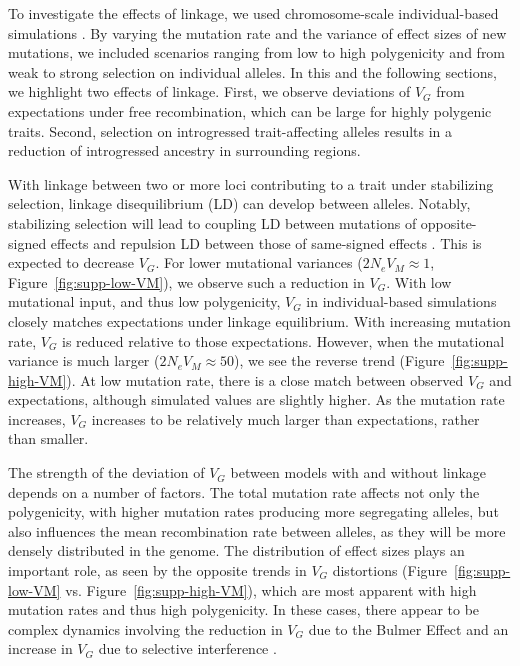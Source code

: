 \documentclass{article}
\begin{document}
To investigate the effects of linkage, we used chromosome-scale
individual-based simulations \citep{thornton2019polygenic}. By varying the
mutation rate and the variance of effect sizes of new mutations, we included
scenarios ranging from low to high polygenicity and from weak to strong
selection on individual alleles. In this and the following sections, we
highlight two effects of linkage. First, we observe deviations of $V_G$ from
expectations under free recombination, which can be large for highly polygenic
traits. Second, selection on introgressed trait-affecting alleles results in a
reduction of introgressed ancestry in surrounding regions.

With linkage between two or more loci contributing to a trait under stabilizing
selection, linkage disequilibrium (LD) can develop between alleles. Notably,
stabilizing selection will lead to coupling LD between mutations of
opposite-signed effects and repulsion LD between those of same-signed effects
\citep{bulmer1971effect}. This is expected to decrease $V_G$. For lower
mutational variances ($2N_e V_M\approx1$, Figure~\ref{fig:supp-low-VM}), we
observe such a reduction in $V_G$. With low mutational input, and thus low
polygenicity, $V_G$ in individual-based simulations closely matches
expectations under linkage equilibrium. With increasing mutation rate, $V_G$ is
reduced relative to those expectations. However, when the mutational variance
is much larger ($2N_eV_M\approx 50$), we see the reverse trend
(Figure~\ref{fig:supp-high-VM}). At low mutation rate, there is a close match
between observed $V_G$ and expectations, although simulated values are slightly
higher. As the mutation rate increases, $V_G$ increases to be relatively much
larger than expectations, rather than smaller.

The strength of the deviation of $V_G$ between models with and without linkage
depends on a number of factors. The total mutation rate affects not only the
polygenicity, with higher mutation rates producing more segregating alleles,
but also influences the mean recombination rate between alleles, as they will
be more densely distributed in the genome. The distribution of effect sizes
plays an important role, as seen by the opposite trends in $V_G$ distortions
(Figure~\ref{fig:supp-low-VM} vs. Figure~\ref{fig:supp-high-VM}), which are
most apparent with high mutation rates and thus high polygenicity. In these
cases, there appear to be complex dynamics involving the reduction in $V_G$ due
to the Bulmer Effect \citep{bulmer1971effect} and an increase in $V_G$ due to
selective interference \citep{hill1966effect}.
\end{document}
